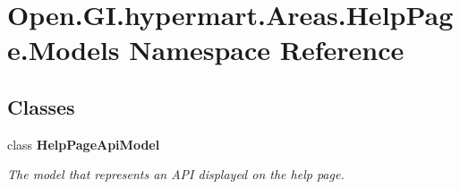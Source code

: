 \section{Open.\+G\+I.\+hypermart.\+Areas.\+Help\+Page.\+Models Namespace Reference}
\label{namespace_open_1_1_g_i_1_1hypermart_1_1_areas_1_1_help_page_1_1_models}
\subsection*{Classes}
\begin{DoxyCompactItemize}
\item 
class \textbf{ Help\+Page\+Api\+Model}
\begin{DoxyCompactList}\small\item\em The model that represents an A\+PI displayed on the help page. \end{DoxyCompactList}\end{DoxyCompactItemize}
